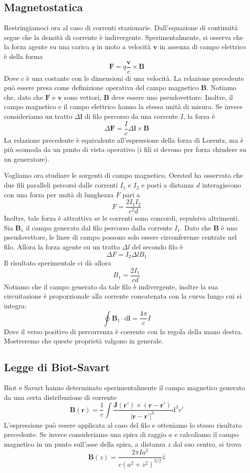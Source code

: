 \documentclass[a4paper,11pt]{book}
\newcommand{\dif}{\mathrm{d}}
\renewcommand{\vec}[1]{\mathbf{#1}}
\theoremstyle{theorem}
\theoremstyle{definition}
\begin{document}
\subsection{Magnetostatica}
Restringiamoci ora al caso di correnti stazionarie. Dall'equazione di continuità segue che la densità di corrente è indivergente. Sperimentalmente, si osserva che la forza agente su una carica $q$ in moto a velocità $\vec{v}$ in assenza di campo elettrico è della forma
\[\vec{F}=q\frac{\vec{v}}{c}\times\vec{B}\]
Dove $c$ è una costante con le dimensioni di una velocità. La relazione precedente può essere presa come definizione operativa del campo magnetico $\vec{B}$. Notiamo che, dato che $\vec{F}$ e $\vec{v}$ sono vettori, $\vec{B}$ deve essere uno pseudovettore. Inoltre, il campo magnetico e il campo elettrico hanno la stessa unità di misura. Se invece consideriamo un tratto $\Delta\vec{l}$ di filo percorso da una corrente $I$, la forza è
\[\Delta\vec{F}=\frac{I}{c}\Delta\vec{l}\times\vec{B}\]
La relazione precedente è equivalente all'espressione della forza di Lorentz, ma è più scomoda da un punto di vista operativo (i fili si devono per forza chiudere su un generatore).

Vogliamo ora studiare le sorgenti di campo magnetico. Oersted ha osservato che due fili paralleli percorsi dalle correnti $I_1$ e $I_2$ e posti a distanza $d$ interagiscono con una forza per unità di lunghezza $F$ pari a
\[F=\frac{2I_1I_2}{c^2d}\]
Inoltre, tale forza è attrattiva se le correnti sono concordi, repulsiva altrimenti. Sia $\vec{B}_1$ il campo generato dal filo percorso dalla corrente $I_1$. Dato che $\vec{B}$ è uno pseudovettore, le linee di campo possono solo essere circonferenze centrate nel filo. Allora la forza agente su un tratto $\Delta l$ del secondo filo è
\[\Delta F=I_2\Delta l B_1\]
Il risultato sperimentale ci dà allora
\[B_1=\frac{2I_1}{cd}\]
Notiamo che il campo generato da tale filo è indivergente, inoltre la sua circuitazione è proporzionale alla corrente concatenata con la curva lungo cui si integra:
\[\oint\vec{B}_1\cdot\dif\vec{l}=\frac{4\pi}{c}I\]
Dove il verso positivo di percorrenza è coerente con la regola della mano destra. Mostreremo che queste proprietà valgono in generale.
\subsection{Legge di Biot-Savart}
Biot e Savart hanno determinato sperimentalmente il campo magnetico generato da una certa distribuzione di corrente
\[\vec{B}(\vec{r})=\frac{1}{c}\int\frac{\vec{J}(\vec{r}')\times(\vec{r}-\vec{r}')}{|\vec{r}-\vec{r}'|^3}\dif^3r'\]
L'espressione può essere applicata al caso del filo e otteniamo lo stesso risultato precedente. Se invece consideriamo una spira di raggio $a$ e calcoliamo il campo magnetico in un punto sull'asse della spira, a distanza $z$ dal suo centro, si trova
\[\vec{B}(z)=\frac{2\pi Ia^2}{c(a^2+z^2)^{3/2}}\hat{z}\]
\newpage
\end{document}
